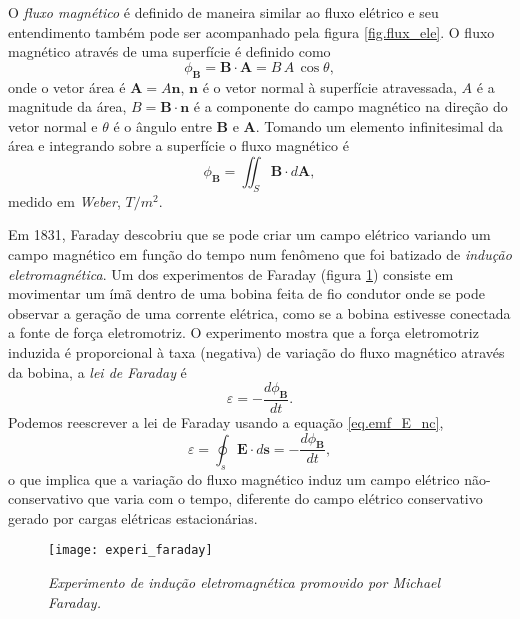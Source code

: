 O \textit{fluxo magnético} é definido de maneira similar ao fluxo elétrico e seu entendimento também pode ser acompanhado pela figura \ref{fig.flux_ele}. O fluxo magnético através de uma superfície é definido como
\begin{equation*}
\phi_\mathbf{B}=\textbf{B}\cdot\textbf{A}=B\,A\,\cos\theta,
\end{equation*}
onde o vetor área é $\textbf{A}=A\textbf{n}$, $\textbf{n}$ é o vetor normal à superfície atravessada, $A$ é a magnitude da área, $B=\textbf{B}\cdot\textbf{n}$ é a componente do campo magnético na direção do vetor normal e $\theta$ é o ângulo entre $\textbf{B}$ e $\pmb{A}$. Tomando um elemento infinitesimal da área e integrando sobre a superfície o fluxo magnético é
\begin{equation}\label{eq.fluxo_mag}
\phi_{\mathbf{B}}=\iint_S\mathbf{B}\cdot d\mathbf{A},
\end{equation}
medido em \textit{Weber}, $T/m^2$. 

Em 1831, Faraday descobriu que se pode criar um campo elétrico variando um campo magnético em função do tempo num fenômeno que foi batizado de \textit{indução eletromagnética}. Um dos experimentos de Faraday (figura \ref{fig.exper_faraday}) consiste em movimentar um ímã dentro de uma bobina feita de fio condutor onde se pode observar a geração de uma corrente elétrica, como se a bobina estivesse conectada a fonte de força eletromotriz. O experimento mostra que a força eletromotriz induzida é proporcional à taxa (negativa) de variação do fluxo magnético através da bobina, a \textit{lei de Faraday} é
\begin{equation*}
\varepsilon=-\frac{d\phi_\mathbf{B}}{dt}.
\end{equation*}
Podemos reescrever a lei de Faraday usando a equação \ref{eq.emf_E_nc},
\begin{equation}\label{eq.lei_faraday}
\varepsilon=\oint_s\pmb{E}\cdot d\pmb{s}=-\frac{d\phi_\mathbf{B}}{dt},
\end{equation}
o que implica que a variação do fluxo magnético induz um campo elétrico não-conservativo que varia com o tempo, diferente do campo elétrico conservativo gerado por cargas elétricas estacionárias.

\begin{figure}[!htb]
\centering
\texttt{[image: experi\_faraday]}
\caption{\textit{Experimento de indução eletromagnética promovido por Michael Faraday.}}
\label{fig.exper_faraday}
\end{figure}


